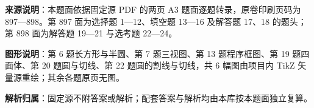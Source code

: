 

\begin{gknotice}
\textbf{来源说明}：本题面依据固定源 PDF 的两页 A3 题面逐题转录，原卷印刷页码为 897—898。第 897 面为选择题 1—12、填空题 13—16 及解答题 17、18 的题头；第 898 面为解答题 19—21 与选考题 22—24。

\textbf{图形说明}：第 6 题长方形与半圆、第 7 题三视图、第 13 题程序框图、第 19 题四面体、第 20 题圆与切线、第 22 题圆的割线与切线，共 6 幅图由项目内 TikZ 矢量源重绘；其余各题原页无图。

\textbf{解析归属}：固定源不附答案或解析；配套答案与解析均由本库按本题面独立复算。
\end{gknotice}


